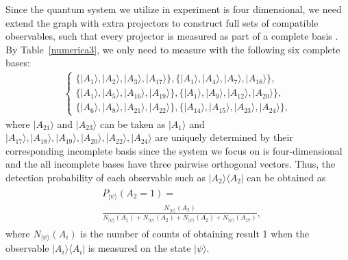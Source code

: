 \documentclass[pra,letterpaper,english,preprint,nofootinbib,aps,superscriptaddress,showkeys]{revtex4-1}
\theoremstyle{definition}
\theoremstyle{remark}
\begin{document}
Since the quantum system we utilize in experiment is four dimensional, we need extend the graph with extra projectors to construct full sets of compatible observables, such that every projector is measured as part of a complete basis \cite{yxiao17}. By Table~\ref{numerica3}, we only need to measure with the following six complete bases:
\begin{eqnarray}
\left\{
  \begin{array}{ll}
    \{|A_1\rangle,|A_2\rangle,|A_3\rangle,|A_{17}\rangle\},  \{|A_1\rangle,|A_4\rangle,|A_7\rangle,|A_{18}\rangle\},\\
\{|A_1\rangle,|A_{5}\rangle,|A_{16}\rangle,|A_{19}\rangle\},
\{|A_1\rangle,|A_{9}\rangle,|A_{12}\rangle,|A_{20}\rangle\},\ \ \ \\
\{|A_{6}\rangle,|A_{8}\rangle,|A_{21}\rangle,|A_{22}\rangle\},
\{|A_{14}\rangle,|A_{15}\rangle,|A_{23}\rangle,|A_{24}\rangle\},
\end{array}
\right.
\end{eqnarray}
where $|A_{21}\rangle$ and $|A_{23}\rangle$ can be taken as $|A_{1}\rangle$ and $|A_{17}\rangle,|A_{18}\rangle,|A_{19}\rangle,|A_{20}\rangle,|A_{22}\rangle,|A_{24}\rangle$ are uniquely determined by their corresponding incomplete basis since the system we focus on is four-dimensional and the  all incomplete bases have three pairwise orthogonal vectors.
 Thus, the detection probability of each observable such as $|A_{2}\rangle\langle A_{2}|$ can be obtained as
\begin{eqnarray}
\begin{split}
&P_{|\psi\rangle}(A_2=1)=\\
&\frac{N_{|\psi\rangle}(A_2)}
{N_{|\psi\rangle}(A_1)+N_{|\psi\rangle}(A_2)+N_{|\psi\rangle}(A_2)+N_{|\psi\rangle}(A_{17})},
\end{split}
\end{eqnarray}
where $N_{|\psi\rangle}(A_i)$ is the number of counts of obtaining result 1 when the observable $|A_{i}\rangle\langle A_{i}|$ is measured on the state $|\psi\rangle.$
\end{document}
